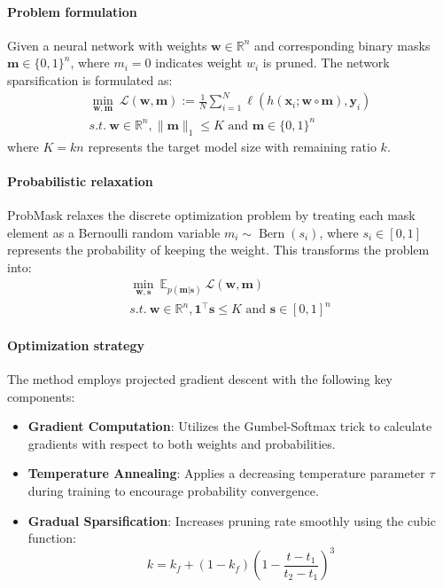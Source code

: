 \paragraph{Problem formulation} Given a neural network with weights $\boldsymbol{w}\in \mathbb{R}^n$ and corresponding binary masks $\boldsymbol{m}\in \{0,1\}^n$, where $m_i=0$ indicates weight $w_i$ is pruned. The network sparsification is formulated as:
\begin{gather}
\min_{\boldsymbol{w}, \boldsymbol{m}} ~\mathcal{L}(\boldsymbol{w}, \boldsymbol{m}):=\frac{1}{N}\sum_{i=1}^{N} \ell\left(h\left(\mathbf{x}_{i} ; \boldsymbol{w\circ m}\right), \mathbf{y}_{i}\right) \nonumber\\
s.t.~ \boldsymbol{w}\in \mathbb{R}^n, \|\boldsymbol{m}\|_1 \leq K \mbox{ and }  \boldsymbol{m}\in \{0,1\}^n \nonumber
\end{gather}
where $K = kn$ represents the target model size with remaining ratio $k$.

\paragraph{Probabilistic relaxation} ProbMask relaxes the discrete optimization problem by treating each mask element as a Bernoulli random variable $m_i \sim \operatorname{Bern}(s_i)$, where $s_i \in [0,1]$ represents the probability of keeping the weight. This transforms the problem into:
\begin{gather}
\min_{\boldsymbol{w}, \boldsymbol{s}} \displaystyle ~\mathbb{E}_{ p(\boldsymbol{m}|\boldsymbol{s})} ~\mathcal{L}(\boldsymbol{w}, \boldsymbol{m}) \nonumber\\ 
s.t. ~\boldsymbol{w}\in \mathbb{R}^n, \boldsymbol{1}^\top \boldsymbol{s}  \leq K \mbox{ and } \boldsymbol{s}\in [0,1]^n \nonumber
\end{gather}

\paragraph{Optimization strategy} The method employs projected gradient descent with the following key components:
\begin{itemize}
    \item \textbf{Gradient Computation}: Utilizes the Gumbel-Softmax trick to calculate gradients with respect to both weights and probabilities.
    \item \textbf{Temperature Annealing}: Applies a decreasing temperature parameter $\tau$ during training to encourage probability convergence.
    \item \textbf{Gradual Sparsification}: Increases pruning rate smoothly using the cubic function:
    $$k=k_{f}+\left(1-k_{f}\right)\left(1-\frac{t-t_{1}}{t_{2}-t_{1}}\right)^{3}$$
\end{itemize}


